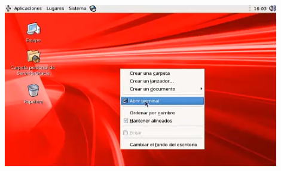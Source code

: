 \documentclass[12pt,letterpaper]{article}
\begin{document}
\begin{center}
\includegraphics[width=12cm]{IMG/oracle3.png} 
\end{center}
\end{document}
